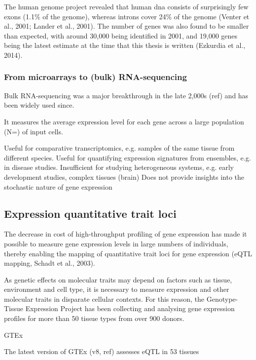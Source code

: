 The human genome project revealed that human \gls{dna}
consists of surprisingly few exons (1.1\% of the genome), whereas introns cover 24\% of the genome (Venter et al., 2001; Lander et al., 2001). 
The number of genes was also found to be smaller than expected, with around 30,000 being identified in 2001, and 19,000 genes being the latest estimate at the time that this thesis is written (Ezkurdia et al., 2014). 

\subsubsection{From microarrays to (bulk) RNA-sequencing}

Bulk RNA-sequencing was a major breakthrough in the late 2,000s (ref) and has been widely used since.

It measures the average expression level for each gene across a large population (N=) of input cells. 

Useful for comparative transcriptomics, e.g. samples of the same tissue from different species.
Useful for quantifying expression signatures from ensembles, e.g. in disease studies.
Insufficient for studying heterogeneous systems, e.g. early development studies, complex tissues (brain)
Does not provide insights into the stochastic nature of gene expression


\subsection{Expression quantitative trait loci}

The decrease in cost of high-throughput profiling of gene expression has made it possible to measure gene expression levels in large numbers of individuals, thereby enabling the mapping of quantitative trait loci for gene expression (eQTL mapping, Schadt et al., 2003).

As genetic effects on molecular traits may depend on factors such as tissue, environment and cell type, it is necessary to measure expression and other molecular traits in disparate cellular contexts. 
For this reason, the Genotype-Tissue Expression Project \cite{gtex2015genotype} has been collecting and analysing gene expression profiles for more than 50 tissue types from over 900 donors.

GTEx \cite{gtex2015genotype, gtex2017genetic, aguet2019gtex}

The latest version of GTEx (v8, ref) assesses eQTL in 53 tissues

